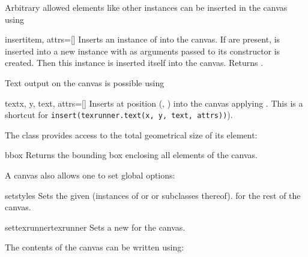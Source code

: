 Arbitrary allowed elements like other  instances can
be inserted in the canvas using

\begin{methoddesc}{insert}{item, attrs=[]}
  Inserts an instance of  into the canvas.  If
   are present,  is inserted into a new
  instance with  as arguments passed to its
  constructor is created. Then this  instance is
  inserted itself into the canvas. Returns .
\end{methoddesc}

Text output on the canvas is possible using

\begin{methoddesc}{text}{x, y, text, attrs=[]}
  Inserts  at position (, ) into the
  canvas applying . This is a shortcut for
  \texttt{insert(texrunner.text(x, y, text, attrs))}).
\end{methoddesc}

The  class provides access to the total geometrical size
of its element:

\begin{methoddesc}{bbox}{}
  Returns the bounding box enclosing all elements of the canvas.
\end{methoddesc}

A canvas also allows one to set global options:

\begin{methoddesc}{set}{styles}
  Sets the given  (instances of  or
   or subclasses thereof).  for the rest of
  the canvas.
\end{methoddesc}

\begin{methoddesc}{settexrunner}{texrunner}
  Sets a new  for the canvas.
\end{methoddesc}

The contents of the canvas can be written using:

